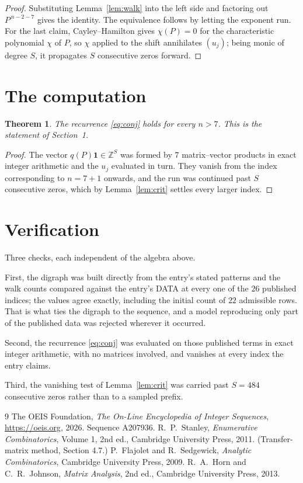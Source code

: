 \documentclass[11pt,a4paper]{article}
\theoremstyle{plain}
\newtheorem{theorem}{Theorem}
\theoremstyle{definition}
\begin{document}
\begin{proof}
Substituting Lemma~\ref{lem:walk} into the left side and factoring out
$P^{\,n-2-7}$ gives the identity. The equivalence follows by letting the exponent
run. For the last claim, Cayley--Hamilton gives $\chi(P)=0$ for the characteristic
polynomial $\chi$ of $P$, so $\chi$ applied to the shift annihilates $(u_j)$; being monic of
degree $S$, it propagates $S$ consecutive zeros forward.
\end{proof}

\section{The computation}

\begin{theorem}
The recurrence \eqref{eq:conj} holds for every $n>7$. This is the statement of
Section~1.
\end{theorem}

\begin{proof}
The vector $q(P)\mathbf{1}\in\mathbb{Z}^{S}$ was formed by $7$ matrix--vector
products in exact integer arithmetic and the $u_j$ evaluated in turn. They vanish from the
index corresponding to $n=7+1$ onwards, and the run was continued past $S$ consecutive
zeros, which by Lemma~\ref{lem:crit} settles every larger index.
\end{proof}

\section{Verification}

Three checks, each independent of the algebra above.

First, the digraph was built directly from the entry's stated patterns and the walk counts
compared against the entry's DATA at every one of the $26$ published indices; the
values agree exactly, including the initial count of $22$ admissible rows. That is
what ties the digraph to the sequence, and a model reproducing only part of the published
data was rejected wherever it occurred.

Second, the recurrence \eqref{eq:conj} was evaluated on those published terms in exact
integer arithmetic, with no matrices involved, and vanishes at every index the entry claims.

Third, the vanishing test of Lemma~\ref{lem:crit} was carried past $S=484$ consecutive
zeros rather than to a sampled prefix.

\begin{thebibliography}{9}
 The OEIS Foundation, \emph{The On-Line Encyclopedia of Integer
Sequences}, \url{https://oeis.org}, 2026. Sequence A207936.
 R.~P.~Stanley, \emph{Enumerative Combinatorics}, Volume 1, 2nd ed.,
Cambridge University Press, 2011. (Transfer-matrix method, Section 4.7.)
 P.~Flajolet and R.~Sedgewick, \emph{Analytic Combinatorics}, Cambridge
University Press, 2009.
 R.~A.~Horn and C.~R.~Johnson, \emph{Matrix Analysis}, 2nd ed., Cambridge
University Press, 2013.
\end{thebibliography}
\end{document}
